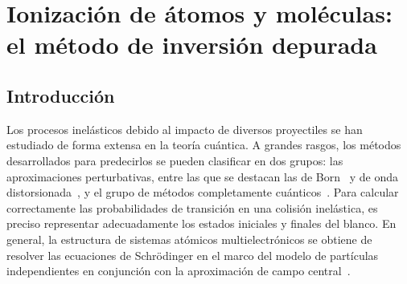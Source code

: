 \chapter{Ionización de átomos y moléculas: el método de inversión 
depurada}
\label{chap:iondim}

\section{Introducción}

Los procesos inelásticos debido al impacto de diversos proyectiles se 
han estudiado de forma extensa en la teoría cuántica. A grandes rasgos, 
los métodos desarrollados para predecirlos se pueden clasificar en dos 
grupos: las aproximaciones perturbativas, entre las que se destacan las 
de Born~\cite{Bates:62,McDowell:61} y de onda 
distorsionada~\cite{Crothers:10,Rivarola:87}, y el grupo de métodos 
completamente cuánticos~\cite{Pindzola:07,Burke:11,Bray:17,
Zatsarinny:04,McCurdy:04}. 
Para calcular correctamente las probabilidades de transición en una 
colisión inelástica, es preciso representar adecuadamente los estados 
iniciales y finales del blanco. En general, la estructura de sistemas 
atómicos multielectrónicos se obtiene de resolver las ecuaciones de 
Schr\"odinger en el marco del modelo de partículas independientes en 
conjunción con la aproximación de campo central~\cite{Bransden:03,
Cowan:81}. 
\begin{comment}
Para calcular correctamente las probabilidades de transición en una 
colisión inelástica, es preciso representar adecuadamente los estados 
iniciales y finales del blanco. En general, la resolución de las 
ecuaciones de Schr\"odinger de sistemas multielectrónicos atómicos 
implementa el modelo de partículas independientes en conjunción con la 
aproximación de campo central~\cite{Bransden:03,Cowan:81}. 

La descripción de la estructura electrónica de sistemas moleculares 
constituye un desafío desde el punto de vista teórico debido a su 
geometría multicéntrica. Sin embargo, se han propuesto diversas 
aproximaciones para tal fin~\cite{Helgaker:00,Schaefer:04}. 

En el marco de la teoría cuántica, los procesos colisionales de átomos 
y moléculas simples debido al impacto de diversos proyectiles se ha 
estudiado de forma extensa. A grandes rasgos, los métodos desarrollados
para predecirlos se puden clasificar en dos grupos: las aproximaciones 
perturbativas, entre las que se destacan las de Born~\cite{Bates:62,
McDowell:61} y de onda distorcionada~\cite{Crothers:10,Rivarola:87}, y 
el grupo de métodos no perturbativos, con técnicas tales como los de 
acoplamiento cercano~\cite{Pindzola:07,Burke:11,Bray:17,Zatsarinny:04,
McCurdy:04}. 
\end{comment}

